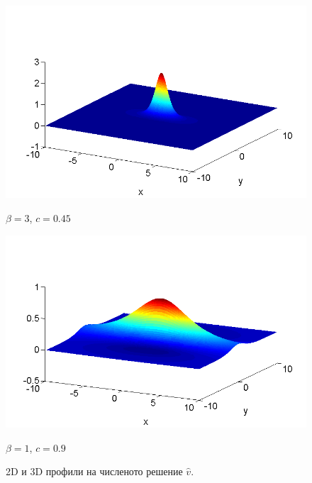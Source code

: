 \documentclass{beamer}
\begin{document}
\begin{frame}
\begin{figure}[ht]
	\begin{minipage}[b]{0.45\linewidth}
		 \raggedleft
		\includegraphics[width=\linewidth]{../Thesis/SolutionView/ChristovIC_30_bt3_c045_prpview.png}		
		\centerline{$\beta = 3$, $c = 0.45$ }
	\end{minipage}
	\begin{minipage}[b]{0.45\linewidth}
		 \raggedright
		\includegraphics[width=\linewidth]{../Thesis/SolutionView/ChristovIC_128_bt1_c090_prpview.png}
		\centerline{$\beta = 1$, $c = 0.9$}
	\end{minipage}
	\caption{2D и 3D профили на численото решение $\widehat v$.}
	\label{fig:solutions}
\end{figure}

\end{frame}
\end{document}
